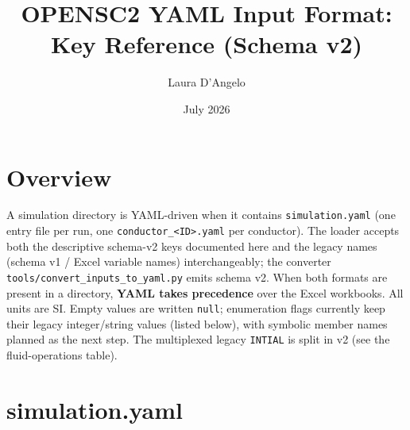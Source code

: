\documentclass[10pt,a4paper]{article}
\title{OPENSC2 YAML Input Format:\\Key Reference (Schema v2)}
\author{Laura D'Angelo}
\date{July 2026}
\newcommand{\code}[1]{\texttt{#1}}
\begin{document}
\maketitle

\section*{Overview}
A simulation directory is YAML-driven when it contains \code{simulation.yaml}
(one entry file per run, one \code{conductor\_<ID>.yaml} per conductor). The
loader accepts both the descriptive schema-v2 keys documented here and the
legacy names (schema v1 / Excel variable names) interchangeably; the converter
\code{tools/convert\_inputs\_to\_yaml.py} emits schema v2. When both formats
are present in a directory, \textbf{YAML takes precedence} over the Excel
workbooks. All units are SI. Empty values are written \code{null}; enumeration
flags currently keep their legacy integer/string values (listed below), with
symbolic member names planned as the next step. The multiplexed legacy
\code{INTIAL} is split in v2 (see the fluid-operations table).

\section*{simulation.yaml}
\end{document}
